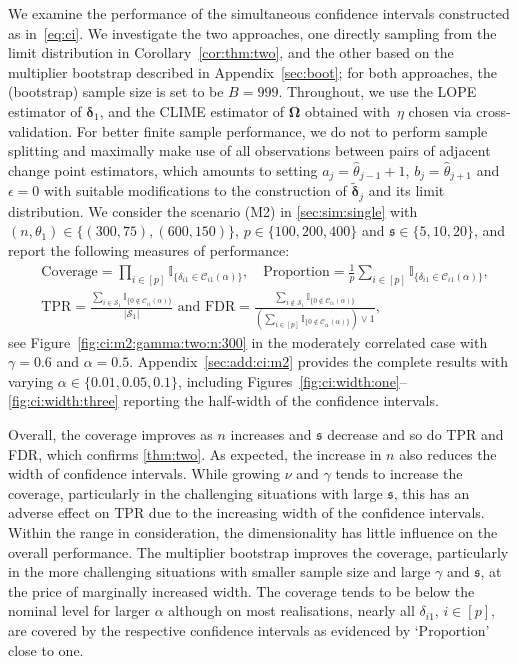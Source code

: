 \documentclass[11pt, a4paper]{article}
\newcommand{\mc}{\mathcal}
\renewcommand{\l}{\left}
\renewcommand{\r}{\right}
\def\wh{\widehat}
\def\wc{\widetilde}
\newcommand{\cp}{\theta}
\theoremstyle{definition}
\theoremstyle{definition}
\theoremstyle{definition}
\theoremstyle{definition}
\theoremstyle{definition}
\theoremstyle{remark}
\theoremstyle{definition}
\theoremstyle{definition}
\theoremstyle{definition}
\begin{document}
We examine the performance of the simultaneous confidence intervals constructed as in~\eqref{eq:ci}.
We investigate the two approaches, one directly sampling from the limit distribution in Corollary~\ref{cor:thm:two}, and the other based on the multiplier bootstrap described in Appendix~\ref{sec:boot}; for both approaches, the (bootstrap) sample size is set to be $B = 999$.
Throughout, we use the LOPE estimator of $\bm\delta_1$, and the CLIME estimator of $\bm\Omega$ obtained with~$\eta$ chosen via cross-validation.
For better finite sample performance, we do not to perform sample splitting and maximally make use of all observations between pairs of adjacent change point estimators, which amounts to setting $a_j = \wh\cp_{j - 1} + 1$, $b_j = \wh\cp_{j + 1}$ and $\epsilon = 0$ with suitable modifications to the construction of $\wc{\bm\delta}_j$ and its limit distribution.
We consider the scenario (M2) in \cref{sec:sim:single} with $(n, \cp_1) \in \{(300, 75), (600, 150)\}$, $p \in \{100, 200, 400\}$ and $\mathfrak{s} \in \{5, 10, 20\}$, and report the following measures of performance:
\begin{align*}
& \mathrm{Coverage} = \prod_{i \in [p]} \mathbb{I}_{\{ \delta_{i1} \in \mc C_{i1}(\alpha) \}}, \quad
\mathrm{Proportion} = \frac{1}{p} \sum_{i \in [p]} \mathbb{I}_{\{ \delta_{i1} \in \mc C_{i1}(\alpha) \}}, \\
& \mathrm{TPR} = \frac{\sum_{i \in \mc S_1} \mathbb{I}_{\{0 \notin \mc C_{i1}(\alpha)\}}}{\vert \mc S_1 \vert} \text{ \ and \ } \mathrm{FDR} = \frac{\sum_{i \notin \mc S_1} \mathbb{I}_{\{0 \notin \mc C_{i1}(\alpha)\}}}{\l(\sum_{i \in [p]} \mathbb{I}_{\{0 \notin \mc C_{i1}(\alpha)\}}\r) \vee 1},
\end{align*}
see Figure~\ref{fig:ci:m2:gamma:two:n:300} in the moderately correlated case with $\gamma = 0.6$ and $\alpha = 0.5$.
Appendix~\ref{sec:add:ci:m2} provides the complete results  with varying $\alpha \in \{0.01, 0.05, 0.1\}$, including Figures~\ref{fig:ci:width:one}--\ref{fig:ci:width:three} reporting the half-width of the confidence intervals. 

Overall, the coverage improves as $n$ increases and $\mathfrak{s}$ decrease and so do TPR and FDR, which confirms \cref{thm:two}. 
As expected, the increase in $n$ also reduces the width of confidence intervals.
While growing $\nu$ and $\gamma$ tends to increase the coverage, particularly in the challenging situations with large $\mathfrak{s}$, this has an adverse effect on TPR due to the increasing width of the confidence intervals.
Within the range in consideration, the dimensionality has little influence on the overall performance.
The multiplier bootstrap improves the coverage, particularly in the more challenging situations with smaller sample size and large $\gamma$ and $\mathfrak{s}$, at the price of marginally increased width.
The coverage tends to be below the nominal level for larger $\alpha$ although on most realisations, nearly all $\delta_{i1}, \, i \in [p]$, are covered by the respective confidence intervals as evidenced by `Proportion' close to one.
\end{document}
